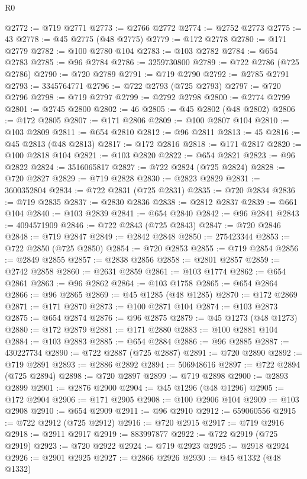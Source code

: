 \begin{lexlean}{R0}
\begin{coremodule}
@2772 := @719 @2771
@2773 := @2766 @2772
@2774 := @2752 @2773
@2775 := 43
@2778 := @45 @2775 (@48 @2775)
@2779 := @172 @2778
@2780 := @171 @2779
@2782 := @100 @2780 @104
@2783 := @103 @2782
@2784 := @654 @2783
@2785 := @96 @2784
@2786 := 3259730800
@2789 := @722 @2786 (@725 @2786)
@2790 := @720 @2789
@2791 := @719 @2790
@2792 := @2785 @2791
@2793 := 3345764771
@2796 := @722 @2793 (@725 @2793)
@2797 := @720 @2796
@2798 := @719 @2797
@2799 := @2792 @2798
@2800 := @2774 @2799
@2801 := @2745 @2800
@2802 := 46
@2805 := @45 @2802 (@48 @2802)
@2806 := @172 @2805
@2807 := @171 @2806
@2809 := @100 @2807 @104
@2810 := @103 @2809
@2811 := @654 @2810
@2812 := @96 @2811
@2813 := 45
@2816 := @45 @2813 (@48 @2813)
@2817 := @172 @2816
@2818 := @171 @2817
@2820 := @100 @2818 @104
@2821 := @103 @2820
@2822 := @654 @2821
@2823 := @96 @2822
@2824 := 3516065817
@2827 := @722 @2824 (@725 @2824)
@2828 := @720 @2827
@2829 := @719 @2828
@2830 := @2823 @2829
@2831 := 3600352804
@2834 := @722 @2831 (@725 @2831)
@2835 := @720 @2834
@2836 := @719 @2835
@2837 := @2830 @2836
@2838 := @2812 @2837
@2839 := @661 @104
@2840 := @103 @2839
@2841 := @654 @2840
@2842 := @96 @2841
@2843 := 4094571909
@2846 := @722 @2843 (@725 @2843)
@2847 := @720 @2846
@2848 := @719 @2847
@2849 := @2842 @2848
@2850 := 275423344
@2853 := @722 @2850 (@725 @2850)
@2854 := @720 @2853
@2855 := @719 @2854
@2856 := @2849 @2855
@2857 := @2838 @2856
@2858 := @2801 @2857
@2859 := @2742 @2858
@2860 := @2631 @2859
@2861 := @103 @1774
@2862 := @654 @2861
@2863 := @96 @2862
@2864 := @103 @1758
@2865 := @654 @2864
@2866 := @96 @2865
@2869 := @45 @1285 (@48 @1285)
@2870 := @172 @2869
@2871 := @171 @2870
@2873 := @100 @2871 @104
@2874 := @103 @2873
@2875 := @654 @2874
@2876 := @96 @2875
@2879 := @45 @1273 (@48 @1273)
@2880 := @172 @2879
@2881 := @171 @2880
@2883 := @100 @2881 @104
@2884 := @103 @2883
@2885 := @654 @2884
@2886 := @96 @2885
@2887 := 430227734
@2890 := @722 @2887 (@725 @2887)
@2891 := @720 @2890
@2892 := @719 @2891
@2893 := @2886 @2892
@2894 := 506948616
@2897 := @722 @2894 (@725 @2894)
@2898 := @720 @2897
@2899 := @719 @2898
@2900 := @2893 @2899
@2901 := @2876 @2900
@2904 := @45 @1296 (@48 @1296)
@2905 := @172 @2904
@2906 := @171 @2905
@2908 := @100 @2906 @104
@2909 := @103 @2908
@2910 := @654 @2909
@2911 := @96 @2910
@2912 := 659060556
@2915 := @722 @2912 (@725 @2912)
@2916 := @720 @2915
@2917 := @719 @2916
@2918 := @2911 @2917
@2919 := 883997877
@2922 := @722 @2919 (@725 @2919)
@2923 := @720 @2922
@2924 := @719 @2923
@2925 := @2918 @2924
@2926 := @2901 @2925
@2927 := @2866 @2926
@2930 := @45 @1332 (@48 @1332)

\end{coremodule}
\end{lexlean}
